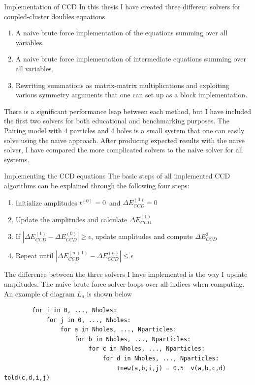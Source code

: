 \documentclass[twoside,english]{uiofysmaster}
\begin{document}
\begin{chapter}{Implementation of CCD}
	In this thesis I have created three different solvers for coupled-cluster doubles equations. 
	\begin{enumerate}
		\item A naive brute force implementation of the equations summing over all variables. 
		\item A naive brute force implementation of intermediate equations summing over all variables.
		\item Rewriting summations as matrix-matrix multiplications and exploiting various symmetry arguments that one can set up as a block implementation.
	\end{enumerate}	
	There is a significant performance leap between each method, but I have included the first two solvers for both educational and benchmarking purposes. The Pairing model with 4 particles and 4 holes is a small system that one can easily solve using the naive approach. After producing expected results with the naive solver, I have compared the more complicated solvers to the naive solver for all systems. 

	\begin{section}{Implementing the CCD equations}
		The basic steps of all implemented CCD algorithms can be explained through the following four steps:
		\begin{enumerate}
			\item Initialize amplitudes $t^{(0)} = 0$ and $\Delta E_{CCD}^{(0)} = 0$
			\item Update the amplitudes and calculate $\Delta E_{CCD}^{(1)}$
			\item If $ |\Delta E_{CCD}^{(1)} - \Delta E_{CCD}^{(0)}| \geq \epsilon $, update amplitudes and compute $\Delta E_{CCD}^{2}$
			\item Repeat until $ |\Delta E_{CCD}^{(n+1)} - \Delta E_{CCD}^{(n)}| \leq \epsilon $
		\end{enumerate}
		The difference between the three solvers I have implemented is the way I update amplitudes. The naive brute force solver loops over all indices when computing. An example of diagram $L_a$ is shown below

		\begin{lstlisting}
		for i in 0, ..., Nholes:
			for j in 0, ..., Nholes:
				for a in Nholes, ..., Nparticles:
					for b in Nholes, ..., Nparticles:
						for c in Nholes, ..., Nparticles:
							for d in Nholes, ..., Nparticles:
								tnew(a,b,i,j) = 0.5  v(a,b,c,d)  told(c,d,i,j)
		\end{lstlisting}


\end{section}
\end{chapter}
\end{document}
